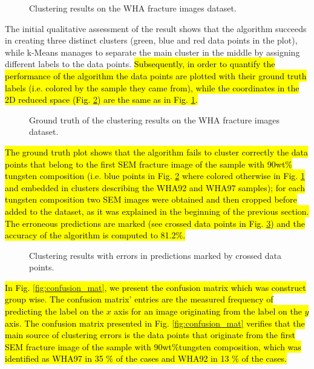 \documentclass[authoryear,preprint,review,12pt, singleside]{elsarticle}
\begin{document}
\begin{figure}[!h]
	\centering
	\caption{Clustering results on the WHA fracture images dataset.}
	\label{fig:cluster_result}
\end{figure}
  
The initial qualitative assessment of the result shows that the algorithm succeeds in creating three distinct clusters (green, blue and red data points in the plot), while k-Means manages to separate the main cluster in the middle by assigning different labels to the data points. \hl{Subsequently, in order to quantify the performance of the algorithm the data points are plotted with their ground truth labels (i.e. colored by the sample they came from), while the coordinates in the 2D reduced space (Fig. {\ref{fig:cluster_result_gt}}) are the same as in Fig. {\ref{fig:cluster_result}}.}  


\begin{figure}[!h]
	\centering
	\caption{Ground truth of the clustering results on the WHA fracture images dataset.}
	\label{fig:cluster_result_gt}
\end{figure}

\hl{The ground truth plot shows that the algorithm fails to cluster correctly the data points that belong to the first SEM fracture image of the sample with 90wt\% tungsten composition (i.e. blue points in Fig.  {\ref{fig:cluster_result_gt}} where colored otherwise in Fig. {\ref{fig:cluster_result}} and embedded in clusters describing the WHA92 and WHA97 samples); for each tungsten composition  two SEM images were obtained and then cropped before added to the dataset, as it was explained in the beginning of the previous section. The erroneous predictions are marked (see crossed data points in Fig. {\ref{fig:cluster_result_errors}}) and the accuracy of the algorithm is computed to 81.2\%.}



\begin{figure}[!h]
	\centering
	\caption{Clustering results with errors in predictions marked by crossed data points.}
	\label{fig:cluster_result_errors}
\end{figure}

\hl{In Fig. {\ref{fig:confusion_mat}}, we present the confusion matrix which was construct group wise. The confusion matrix' entries are the measured  frequency of predicting the label on the $x$ axis for an image originating from the label on the $y$ axis. The confusion matrix presented in Fig. {\ref{fig:confusion_mat}} verifies that the main source of clustering errors is the data points that originate from the first SEM fracture image of the  sample with 90wt$\% $tungsten composition, which was identified as WHA97 in 35 $\%$ of the cases and WHA92 in 13 $\%$ of the cases. }
\end{document}
